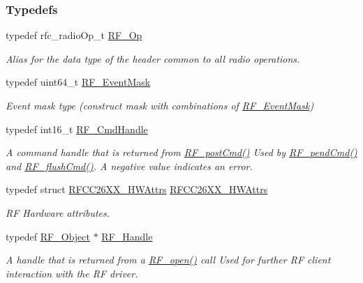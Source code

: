 \subsubsection*{Typedefs}
\begin{DoxyCompactItemize}
\item 
typedef rfc\+\_\+radio\+Op\+\_\+t \hyperlink{_r_f_8h_a47ea3dea78019340e8f8ceb854de5f02}{R\+F\+\_\+\+Op}
\begin{DoxyCompactList}\small\item\em Alias for the data type of the header common to all radio operations. \end{DoxyCompactList}\item 
typedef uint64\+\_\+t \hyperlink{_r_f_8h_a128c46e18dbbaa781abb7abafc35233a}{R\+F\+\_\+\+Event\+Mask}
\begin{DoxyCompactList}\small\item\em Event mask type (construct mask with combinations of \hyperlink{_r_f_8h_a128c46e18dbbaa781abb7abafc35233a}{R\+F\+\_\+\+Event\+Mask}) \end{DoxyCompactList}\item 
typedef int16\+\_\+t \hyperlink{_r_f_8h_acab1f56c62a9fd1ad0a91a46b6da23f1}{R\+F\+\_\+\+Cmd\+Handle}
\begin{DoxyCompactList}\small\item\em A command handle that is returned from \hyperlink{_r_f_8h_a2b0ee444fcb74917df94eefea804ecbb}{R\+F\+\_\+post\+Cmd()} Used by \hyperlink{_r_f_8h_a91c1cb2508311f822acbc08ace568a83}{R\+F\+\_\+pend\+Cmd()} and \hyperlink{_r_f_8h_ae3ff5c614f4a63cb4e79c90f9229149a}{R\+F\+\_\+flush\+Cmd()}. A negative value indicates an error. \end{DoxyCompactList}\item 
typedef struct \hyperlink{struct_r_f_c_c26_x_x___h_w_attrs}{R\+F\+C\+C26\+X\+X\+\_\+\+H\+W\+Attrs} \hyperlink{_r_f_8h_ac2049f9479d04c217097ca43ffe07c14}{R\+F\+C\+C26\+X\+X\+\_\+\+H\+W\+Attrs}
\begin{DoxyCompactList}\small\item\em R\+F Hardware attributes. \end{DoxyCompactList}\item 
typedef \hyperlink{struct_r_f___object}{R\+F\+\_\+\+Object} $\ast$ \hyperlink{_r_f_8h_a5e8ab7fc87fb818f435d9b6226ee573f}{R\+F\+\_\+\+Handle}
\begin{DoxyCompactList}\small\item\em A handle that is returned from a \hyperlink{_r_f_8h_a13a7c6f5a2b797e0aac18fecfaba6f64}{R\+F\+\_\+open()} call Used for further R\+F client interaction with the R\+F driver. \end{DoxyCompactList}\item 

\end{DoxyCompactItemize}
